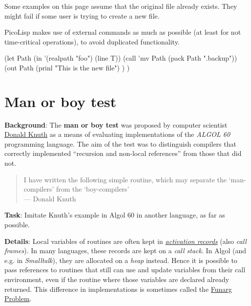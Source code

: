 Some examples on this page assume that the original file already exists.
They might fail if some user is trying to create a new file.

\begin{wideverbatim}

PicoLisp makes use of external commands as much as possible (at
least for not time-critical operations), to avoid duplicated
functionality.

(let Path (in '(realpath "foo") (line T))
   (call 'mv Path (pack Path ".backup"))
   (out Path
      (prinl "This is the new file") ) )

\end{wideverbatim}

\pagebreak{}
\section*{Man or boy test}

\textbf{Background}: The \textbf{man or boy test} was proposed by
computer scientist
\href{http://en.wikipedia.org/wiki/Donald\_Knuth}{Donald Knuth} as a
means of evaluating implementations of the \emph{ALGOL 60} programming
language. The aim of the test was to distinguish compilers that
correctly implemented ``recursion and non-local references'' from
those that did not.

\begin{quote}
I have written the following simple routine, which may separate the
`man-compilers' from the `boy-compilers'\\ --- Donald Knuth
\end{quote}

\textbf{Task}: Imitate Knuth's example in Algol 60 in another language,
as far as possible.

\textbf{Details}: Local variables of routines are often kept in
\href{http://c2.com/cgi/wiki?ActivationRecord}{\emph{activation
records}} (also \emph{call frames}). In many languages, these records
are kept on a \emph{call stack}. In Algol (and e.g.
in \emph{Smalltalk}), they are allocated on a
\emph{heap} instead. Hence it is possible to pass references
to routines that still can use and update variables from their call
environment, even if the routine where those variables are declared
already returned. This difference in implementations is sometimes called
the \href{http://en.wikipedia.org/wiki/Funarg\_problem}{Funarg Problem}.

